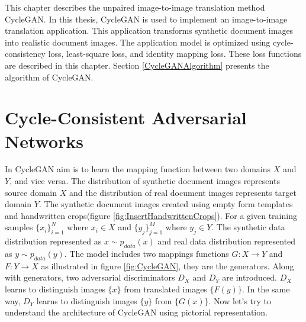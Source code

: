 This chapter describes the unpaired image-to-image translation method \ac{CycleGAN}. In this thesis, \ac{CycleGAN} is used to implement an image-to-image translation application. This application transforms synthetic document images into realistic document images. The application model is optimized using cycle-consistency loss, least-square loss, and identity mapping loss. These loss functions are described in this chapter. Section \ref{CycleGANAlgorithm} presents the algorithm of \ac{CycleGAN}.

\section{Cycle-Consistent Adversarial Networks}\label{CycleConsistentAdversarialNetworks}


In \ac{CycleGAN} aim is to learn the mapping function between two domains $X$ and $Y$, and vice versa. The distribution of synthetic document images represents source domain $X$ and the distribution of real document images represents target domain $Y$.  The synthetic document images created using empty form templates and handwritten crops(figure \ref{fig:InsertHandwrittenCrops}). For a given training samples $\{x_i\}_{i=1}^{N}$ where $x_i \in X$ and $\{y_j\}_{j=1}^{M}$ where $y_j \in Y$. The synthetic data distribution represented as $x \sim p_{data}(x)$ and real data distribution represented as $y \sim p_{data}(y)$. The model includes two mappings functions $G : X \rightarrow Y$ and $F : Y \rightarrow X$ as illustrated in figure \ref{fig:CycleGAN}, they are the generators. Along with generators, two adversarial discriminators $D_X$ and $D_Y$ are introduced. $D_X$ learns to distinguish images $\{x\}$ from translated images $\{F(y)\}$. In the same way, $D_Y$ learns to distinguish images $\{y\}$ from $\{G(x)\}$. Now let's try to understand the architecture of \ac{CycleGAN} using pictorial representation.

